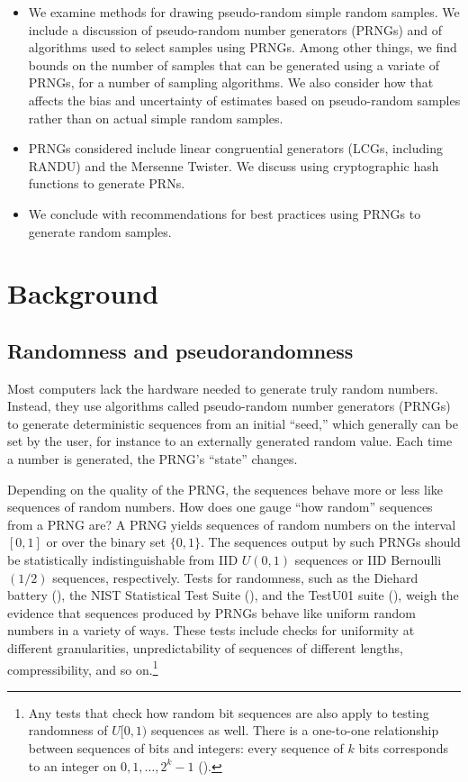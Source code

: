 \documentclass[12pt]{article}
\begin{document}
\begin{itemize}
\item We examine methods for drawing pseudo-random simple random samples. 
We include a discussion of pseudo-random number generators (PRNGs) and 
of algorithms used to select samples using PRNGs.
Among other things, we find bounds on the number of samples that can be generated 
using a variate of PRNGs, for a number of sampling algorithms. 
We also consider how that affects the bias and uncertainty of estimates based on pseudo-random
samples rather than on actual simple random samples.
\item PRNGs considered include linear congruential generators (LCGs, including RANDU)
and the Mersenne Twister. We discuss using cryptographic hash functions to generate PRNs.
\item We conclude with recommendations for best practices using PRNGs to generate random samples.
\end{itemize}



\section{Background}
\subsection{Randomness and pseudorandomness}
Most computers lack the hardware needed to generate truly random numbers. 
Instead, they use algorithms called pseudo-random number generators (PRNGs) to generate
deterministic sequences from an initial ``seed,'' which generally can be set by the user,
for instance to an externally generated random value.
Each time a number is generated, the PRNG's ``state'' changes.

Depending on the quality of the PRNG, the sequences behave more or less like sequences of random numbers.
How does one gauge ``how random'' sequences from a PRNG are?
A PRNG yields sequences of random numbers on the interval $[0, 1]$ or over the binary set $\{0, 1\}$.
The sequences output by such PRNGs should be statistically indistinguishable from IID $U(0,1)$ sequences or
IID Bernoulli$(1/2)$ sequences, respectively.
Tests for randomness, such as the Diehard battery (\cite{marsaglia_diehard_1995}), the NIST Statistical Test Suite (\cite{soto_statistical_1999,rukhin_statistical_2010}), and the TestU01 suite (\cite{lecuyer_testu01_2007}),
weigh the evidence that sequences produced by PRNGs behave like uniform random numbers in a variety of ways.
These tests include checks for uniformity at different granularities,
unpredictability of sequences of different lengths,
compressibility, and so on.\footnote{
Any tests that check how random bit sequences are also apply to testing randomness of $U[0,1)$ sequences as well.
There is a one-to-one relationship between sequences of bits and integers:
every sequence of $k$ bits corresponds to an integer on $0, 1, \dots, 2^k-1$ (\cite{lecuyer_testu01_2007}).
}
\end{document}
